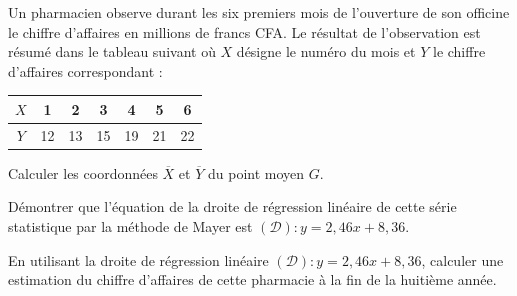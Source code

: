 \documentclass[11pt]{article}
\begin{document}
Un pharmacien observe durant les six premiers mois de l'ouverture de son officine le chiffre d'affaires en millions de francs CFA. Le résultat de l'observation est résumé dans le tableau suivant où $X$ désigne le numéro du mois et $Y$ le chiffre d'affaires correspondant :
\begin{center}\renewcommand{\arraystretch}{1.4}
\begin{tabular}{|c|c|c|c|c|c|c|}
\hline
$X$ & 1 & 2 & 3 & 4 & 5 & 6 \\
\hline
$Y$ & 12 & 13 & 15 & 19 & 21 & 22 \\
\hline
\end{tabular}
\end{center}
\begin{questions}
  \item Calculer les coordonnées $\overline{X}$ et $\overline{Y}$ du point moyen $G$.
  \item Démontrer que l'équation de la droite de régression linéaire de cette série statistique par la méthode de Mayer est $(\mathcal{D}) : y = 2{,}46x + 8{,}36$.
  \item En utilisant la droite de régression linéaire $(\mathcal{D}) : y = 2{,}46x + 8{,}36$, calculer une estimation du chiffre d'affaires de cette pharmacie à la fin de la huitième année.
\end{questions}
\end{document}
